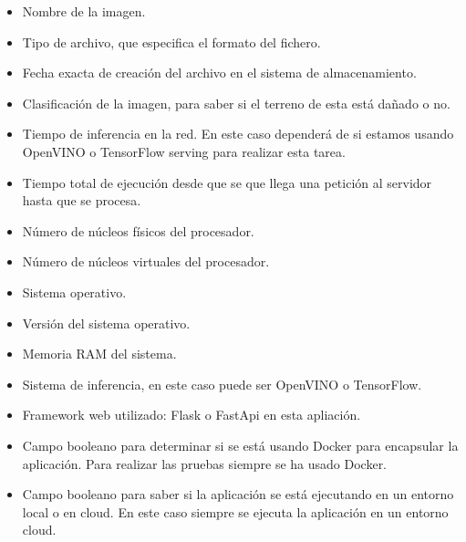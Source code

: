 \begin{itemize}
    \item Nombre de la imagen.
    \item Tipo de archivo, que especifica el formato del fichero.
    \item Fecha exacta de creación del archivo en el sistema de almacenamiento.
    \item Clasificación de la imagen, para saber si el terreno de esta está dañado o no.
    \item Tiempo de inferencia en la red.
    En este caso dependerá de si estamos usando OpenVINO o TensorFlow serving para realizar esta tarea.
    \item Tiempo total de ejecución desde que se que llega una petición al servidor hasta que se procesa.
    \item Número de núcleos físicos del procesador.
    \item Número de núcleos virtuales del procesador.
    \item Sistema operativo.
    \item Versión del sistema operativo.
    \item Memoria RAM del sistema.
    \item Sistema de inferencia, en este caso puede ser OpenVINO o TensorFlow.
    \item Framework web utilizado: Flask o FastApi en esta apliación.
    \item Campo booleano para determinar si se está usando Docker para encapsular la aplicación.
    Para realizar las pruebas siempre se ha usado Docker.
    \item Campo booleano para saber si la aplicación se está ejecutando en un entorno local o en cloud.
    En este caso siempre se ejecuta la aplicación en un entorno cloud.
\end{itemize}


